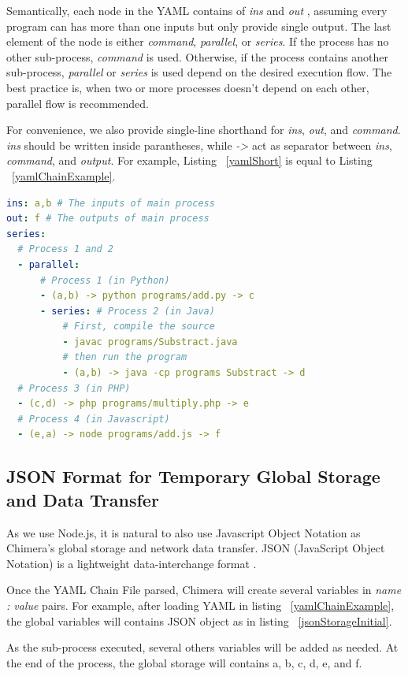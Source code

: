 \documentclass[conference]{IEEEtran}
\begin{document}
Semantically, each node in the YAML contains of {\it ins} and {\it out }, assuming
every program can has more than one inputs but only provide single output. The last
element of the node is either {\it command}, {\it parallel}, or {\it series}. 
If the process has no other sub-process, {\it command} is used. Otherwise, if the
process contains another sub-process, {\it parallel} or {\it series} is used depend
on the desired execution flow. The best practice is, when two or more processes
doesn't depend on each other, parallel flow is recommended.

For convenience, we also provide single-line shorthand for {\it ins}, {\it out}, 
and {\it command}. {\it ins} should be written inside parantheses, while {\it ->}
act as separator between {\it ins}, {\it command}, and {\it output}. For example,
Listing  ~\ref{yamlShort} is equal to Listing ~\ref{yamlChainExample}.

\begin{lstlisting}[caption=YAML Chain With Shorthand, label=yamlShort, language=yaml, basicstyle=\small, breaklines=true]
ins: a,b # The inputs of main process 
out: f # The outputs of main process 
series:
  # Process 1 and 2 
  - parallel:
      # Process 1 (in Python) 
      - (a,b) -> python programs/add.py -> c
      - series: # Process 2 (in Java) 
          # First, compile the source  
          - javac programs/Substract.java
          # then run the program 
          - (a,b) -> java -cp programs Substract -> d
  # Process 3 (in PHP) 
  - (c,d) -> php programs/multiply.php -> e
  # Process 4 (in Javascript) 
  - (e,a) -> node programs/add.js -> f
\end{lstlisting}


\subsection{JSON Format for Temporary Global Storage and Data Transfer}

As we use Node.js, it is natural to also use Javascript Object Notation as Chimera's
global storage and network data transfer. JSON (JavaScript Object Notation) is a 
lightweight data-interchange format \cite{json}.

Once the YAML Chain File parsed, Chimera will create several variables in {\it name : 
value} pairs. For example, after loading YAML in listing ~\ref{yamlChainExample}, the
global variables will contains JSON object as in listing ~\ref{jsonStorageInitial}.

As the sub-process executed, several others variables will be added as needed. At the
end of the process, the global storage will contains a, b, c, d, e, and f.
\end{document}
